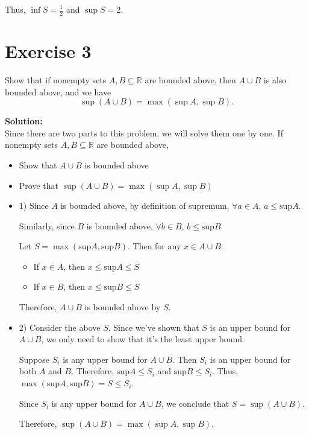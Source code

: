 \documentclass{article}
\begin{document}
Thus, $\inf S = \frac{1}{2}$ and $\sup S = 2$.
\newpage

\section*{Exercise 3}
Show that if nonempty sets $A, B \subseteq \mathbb{R}$ are bounded above, then $A \cup B$ is also bounded above, and we have
\[\sup(A \cup B) = \max(\sup A, \sup B).\]

\textbf{Solution:} \\

Since there are two parts to this problem, we will solve them one by one. If nonempty sets $A, B \subseteq \mathbb{R}$ are bounded above,
\begin{itemize}
    \item Show that $A \cup B$ is bounded above
    \item Prove that $\sup(A \cup B) = \max(\sup A, \sup B)$
\end{itemize}

\begin{itemize}
\item 1) Since $A$ is bounded above, by definition of supremum, $\forall a \in A$, $a \leq \text{sup}A$. 

Similarly, since $B$ is bounded above, $\forall b \in B$, $b \leq \text{sup}B$

Let $S = \max(\text{sup}A, \text{sup}B)$. Then for any $x \in A \cup B$:
\begin{itemize}
    \item If $x \in A$, then $x \leq \text{sup}A \leq S$
    \item If $x \in B$, then $x \leq \text{sup}B \leq S$
\end{itemize}
Therefore, $A \cup B$ is bounded above by $S$.

\item 2) Consider the above $S$. Since we've shown that $S$ is an upper bound for $A \cup B$, we only need to show that it's the least upper bound.

Suppose $S_i$ is any upper bound for $A \cup B$.
Then $S_i$ is an upper bound for both $A$ and $B$.
Therefore, $\text{sup}A \leq S_i$ and $\text{sup}B \leq S_i$.
Thus, $\max(\text{sup}A, \text{sup}B) = S \leq S_i$.

Since $S_i$ is any upper bound for $A \cup B$, we conclude that $S = \sup(A \cup B)$.

Therefore, $\sup(A \cup B) = \max(\sup A, \sup B)$.

\end{itemize}
\end{document}

